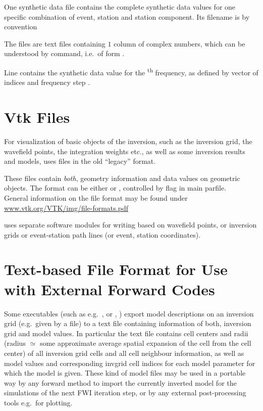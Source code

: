 One synthetic data file contains the complete synthetic data values for one specific combination of
event, station and station component. Its filename is by convention 

The files are text files containing $1$ column of   
complex numbers, which can be understood by   command, i.e.\ of form  .

Line  contains the synthetic data value for the \textsuperscript{th} frequency, as defined by vector
of indices  and frequency step .
%
\section{Vtk Files} \label{files,sec:vtk_files}
%
For visualization of basic objects of the inversion, such as the inversion grid, 
the wavefield points, the integration weights etc., as well as some inversion results
and models, \ASKI{} uses  files in the old ``legacy'' format.

These files contain \emph{both}, geometry
information and data values on geometric objects. The format can be either  or 
, controlled by flag  in main parfile.\\
General information on the file format may be found under \url{www.vtk.org/VTK/img/file-formats.pdf}

\ASKI{} uses separate software modules for writing  based on wavefield points, or 
inversion grids or event-station path lines (or event, station coordinates). 
%
\section{Text-based  File Format for Use with External Forward Codes} \label{files,sec:text-kim_files}
%
Some executables (such as e.g.\ , 
or , )
export model descriptions on an inversion grid (e.g.\ given by a  file) to a text file
containing information of both, inversion grid and model values. In particular the text file contains
cell centers and radii (radius $\simeq$ some approximate average spatial expansion of the cell from the cell center) 
of all inversion grid cells and all cell neighbour information, as well as model values and 
corresponding invgrid cell indices for each model parameter for which the model is given. 
These kind of model files may be used in a portable way by any forward method to import the currently inverted model
for the simulations of the next FWI iteration step, or by any external post-processing tools e.g.\ for plotting. 

